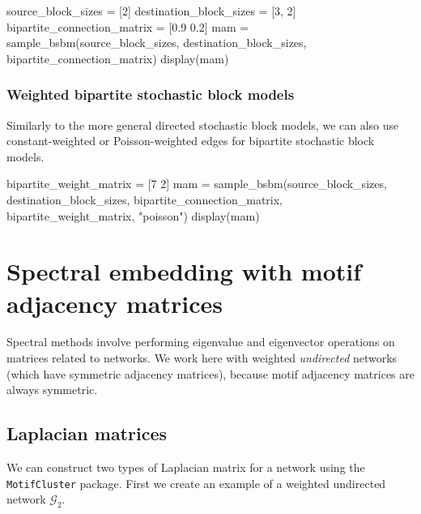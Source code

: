 \documentclass{article}
\begin{document}
\begin{tcolorbox}[colback=black!5!white,colframe=black!15!white]
\begin{juliablock}
source_block_sizes = [2]
destination_block_sizes = [3, 2]
bipartite_connection_matrix = [0.9 0.2]
mam = sample_bsbm(source_block_sizes, destination_block_sizes,
                  bipartite_connection_matrix)
display(mam)
\end{juliablock}
\texttt{\obeylines\printpythontex}
\end{tcolorbox}

\subsubsection{Weighted bipartite stochastic block models}

Similarly to the more general directed stochastic block models,
we can also use constant-weighted or Poisson-weighted edges for bipartite
stochastic block models.

\begin{tcolorbox}[colback=black!5!white,colframe=black!15!white]
\begin{juliablock}
bipartite_weight_matrix = [7 2]
mam = sample_bsbm(source_block_sizes, destination_block_sizes,
                  bipartite_connection_matrix, bipartite_weight_matrix, "poisson")
display(mam)
\end{juliablock}
\texttt{\obeylines\printpythontex}
\end{tcolorbox}




\section{Spectral embedding with motif adjacency matrices}

Spectral methods involve performing eigenvalue and
eigenvector operations on matrices related to networks.
We work here with weighted \emph{undirected} networks
(which have symmetric adjacency matrices),
because motif adjacency matrices are always symmetric.

\subsection{Laplacian matrices}

We can construct two types of Laplacian matrix for a network
using the \texttt{MotifCluster} package.
First we create an example of a weighted undirected network $\mathcal{G}_2$.
\end{document}
